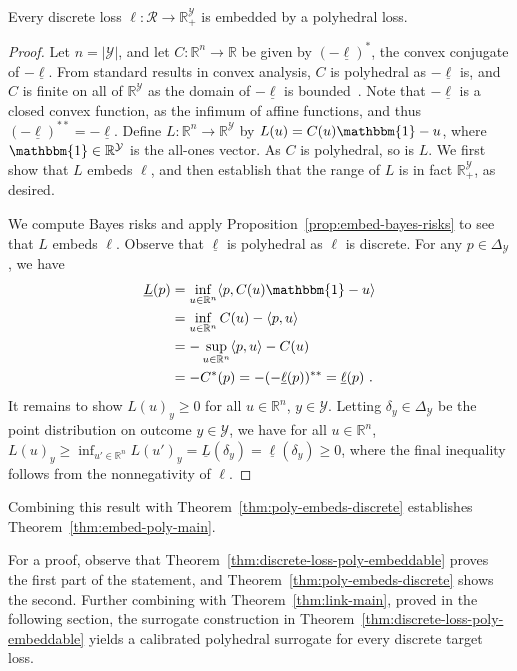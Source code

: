 \documentclass[twoside,11pt]{article}
\newcommand{\reals}{\mathbb{R}}
\newcommand{\simplex}{\Delta_\Y}
\newcommand{\R}{\mathcal{R}}
\newcommand{\Y}{\mathcal{Y}}
\newcommand{\risk}[1]{\underline{#1}}
\newcommand{\inprod}[2]{\langle #1, #2 \rangle}%
\newcommand{\ones}{\mathbbm{1}}
\begin{document}
\begin{theorem}\label{thm:discrete-loss-poly-embeddable}
  Every discrete loss $\ell:\R \to \reals^\Y_+$ is embedded by a polyhedral loss.
\end{theorem}
\begin{proof}
  Let $n = |\Y|$, and let $C:\reals^n \to \reals$ be given by $(-\risk{\ell})^*$, the convex conjugate of $-\risk{\ell}$.
  From standard results in convex analysis, $C$ is polyhedral as $-\risk{\ell}$ is, and $C$ is finite on all of $\reals^\Y$ as the domain of $-\risk{\ell}$ is bounded~\cite[Corollary 13.3.1]{rockafellar1997convex}.
  Note that $-\risk{\ell}$ is a closed convex function, as the infimum of affine functions, and thus $(-\risk{\ell})^{**} = -\risk{\ell}$.
  Define $L:\reals^n\to\reals^\Y$ by $L(u) = C(u)\ones - u$, where $\ones\in\reals^\Y$ is the all-ones vector.
  As $C$ is polyhedral, so is $L$.
  We first show that $L$ embeds $\ell$, and then establish that the range of $L$ is in fact $\reals^\Y_+$, as desired.

  We compute Bayes risks and apply Proposition~\ref{prop:embed-bayes-risks} to see that $L$ embeds $\ell$.
  Observe that $\risk{\ell}$ is polyhedral as $\ell$ is discrete.
  For any $p\in\simplex$, we have
  \begin{align*}
    \risk{L}(p)
    &= \inf_{u\in\reals^n} \inprod{p}{C(u)\ones - u}\\
    &= \inf_{u\in\reals^n} C(u) - \inprod{p}{u}\\
    &= -\sup_{u\in\reals^n} \inprod{p}{u} - C(u)\\
    &= -C^*(p) = - (-\risk{\ell}(p))^{**} = \risk{\ell}(p)~.
  \end{align*}
  It remains to show $L(u)_y \geq 0$ for all $u\in\reals^n$, $y\in\Y$.
  Letting $\delta_y\in\simplex$ be the point distribution on outcome $y\in\Y$, we have for all $u\in\reals^n$, $L(u)_y \geq \inf_{u'\in\reals^n} L(u')_y = \risk{L}(\delta_y) = \risk{\ell}(\delta_y) \geq 0$, where the final inequality follows from the nonnegativity of $\ell$.
\end{proof}

Combining this result with Theorem~\ref{thm:poly-embeds-discrete} establishes Theorem~\ref{thm:embed-poly-main}.


\embedpolyinformal*
For a proof, observe that Theorem~\ref{thm:discrete-loss-poly-embeddable} proves the first part of the statement, and Theorem~\ref{thm:poly-embeds-discrete} shows the second.
Further combining with Theorem~\ref{thm:link-main}, proved in the following section, the surrogate construction in Theorem~\ref{thm:discrete-loss-poly-embeddable} yields a calibrated polyhedral surrogate for every discrete target loss.
\end{document}
